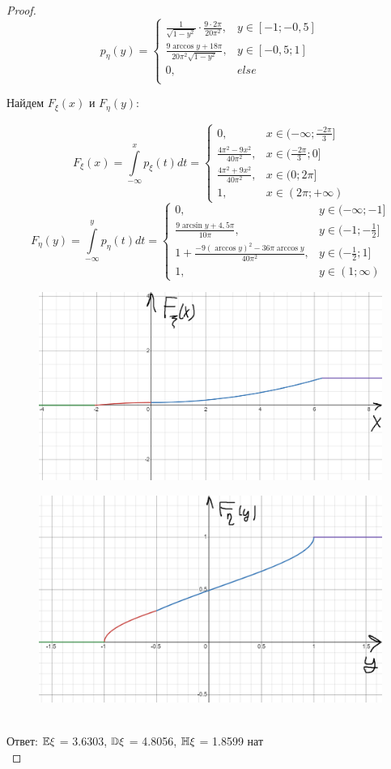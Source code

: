 \begin{proof}
\[
p_{\eta}(y) = \begin{cases}
    \frac{1}{\sqrt{1 - y^2}}\cdot \frac{9 \cdot 2\pi}{20\pi^2}, & y\in [-1;-0,5]\\
   \frac{9\arccos{y} + 18\pi}{20\pi^2 \sqrt{1-y^2}}, & y\in [-0,5;1]\\
   0, & else\\
\end{cases}
\]

Найдем $ F_{\xi}(x)$ и $ F_{\eta}(y)$:

\[
F_{\xi}(x) = \int\limits_{-\infty}^xp_{\xi}(t)dt = \begin{cases}
    0, & x\in (-\infty;\frac{-2\pi}{3}]\\
    \frac{4\pi^2-9x^2}{40\pi^2}, & x\in (\frac{-2\pi}{3}; 0]\\
    \frac{4\pi^2+9x^2}{40\pi^2}, & x\in (0; 2\pi]\\
    1, & x\in (2\pi;+\infty)
\end{cases}
\]
\[
F_{\eta}(y) = \int\limits_{-\infty}^yp_{\eta}(t)dt = \begin{cases}
    0, & y\in (-\infty;-1]\\
    \frac{9\arcsin{y} + 4,5\pi}{10\pi}, & y\in (-1; -\frac{1}{2}]\\
    1 + \frac{-9(\arccos{y})^2 - 36\pi\arccos{y}}{40\pi^2}, & y\in (-\frac{1}{2}; 1]\\
    1, & y\in (1;\infty)
\end{cases}
\]
\begin{figure}[H]
    \centering
    \includegraphics[width=0.5\linewidth]{2idz_4.png}
    \caption{}
\end{figure}
\begin{figure}[H]
    \centering
    \includegraphics[width=0.5\linewidth]{2idz_5.png}
    \caption{}
\end{figure}\\
Ответ: $\mathbb E\xi$ = 3.6303, $\mathbb D\xi$ = 4.8056, $\mathbb H\xi$ = 1.8599 нат\\
\end{proof}